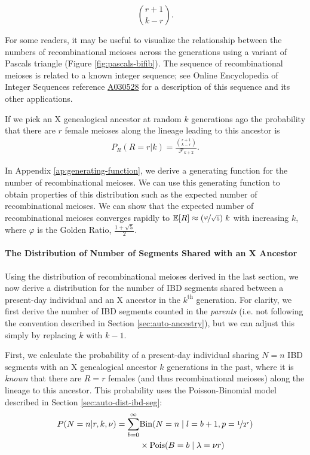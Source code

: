 \documentclass[9pt,twocolumn,twoside]{gsajnl}
\newcommand{\E}{\mathbb{E}}
\begin{document}
\begin{equation}
{ r + 1 \choose k - r}.
\end{equation}

For some readers, it may be useful to visualize the relationship between the
numbers of recombinational meioses across the generations using a variant of
Pascals triangle (Figure \ref{fig:pascals-bifib}). The sequence of
recombinational meioses is related to a known integer sequence; see Online
Encyclopedia of Integer Sequences reference
\href{https://oeis.org/A030528}{A030528} \citep{sloane2014online} for a
description of this sequence and its other applications.

If we pick an X genealogical ancestor at random $k$ generations ago the
probability that there are $r$ female meioses along the lineage leading to this
ancestor is
\begin{align}
  \label{eq:recomb-pmf}
  P_R(R = r | k) = \frac{{r + 1 \choose k - r}}{\mathcal{F}_{k+2}}.
\end{align}

In Appendix \ref{ap:generating-function}, we derive a generating function for
the number of recombinational meioses. We can use this generating function to
obtain properties of this distribution such as the expected number of
recombinational meioses. We can show that the expected number of
recombinational meioses converges rapidly to $\E[R] \approx
(\nicefrac{\varphi}{\sqrt{5}}) \; k$ with increasing $k$, where $\varphi$ is
the Golden Ratio, $\frac{1 + \sqrt{5}}{2}$.

\paragraph{The Distribution of Number of Segments Shared with an X Ancestor}

Using the distribution of recombinational meioses derived in the last section,
we now derive a distribution for the number of IBD segments shared between a
present-day individual and an X ancestor in the $k^\text{th}$ generation. For
clarity, we first derive the number of IBD segments counted in the
\emph{parents} (i.e. not following the convention described in Section
\ref{sec:auto-ancestry}), but we can adjust this simply by replacing $k$ with
$k-1$.

First, we calculate the probability of a present-day individual sharing $N=n$
IBD segments with an X genealogical ancestor $k$ generations in the past, where
it is \emph{known} that there are $R=r$ females (and thus recombinational
meioses) along the lineage to this ancestor. This probability uses the
Poisson-Binomial model described in Section \ref{sec:auto-dist-ibd-seg}:
%
\begin{align}
  P(N=n | r, k, \nu) = \sum_{b=0}^\infty &\text{Bin}(N=n \;|\; l=b+1, p=\nicefrac{1}{2^r}) \\ \nonumber
  &\times \text{Pois}(B=b \;|\; \lambda=\nu r)
  \label{eq:likelihood-n}
\end{align}
%
\end{document}
